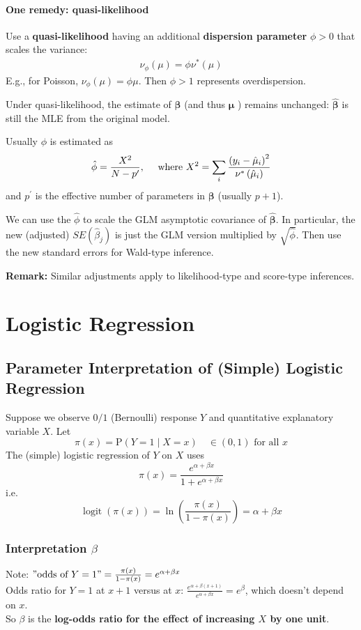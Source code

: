 \documentclass[11pt]{elegantbook}
\begin{document}
\subsubsection*{One remedy: quasi-likelihood}
Use a \textbf{quasi-likelihood} having an additional \textbf{dispersion parameter} $\phi>0$ that scales the variance:
\begin{equation}
    \begin{aligned}
        \nu_\phi(\mu)=\phi\nu^*(\mu)
    \end{aligned}
    \nonumber
\end{equation}
E.g., for Poisson, $\nu_\phi(\mu)=\phi\mu$. Then $\phi > 1$ represents overdispersion.

Under quasi-likelihood, the estimate of $\boldsymbol{\beta}$ (and thus $\boldsymbol{\mu}$ ) remains unchanged: $\hat{\boldsymbol{\beta}}$ is still the MLE from the original model.

Usually $\phi$ is estimated as
$$
\hat{\phi}=\frac{X^2}{N-p^{\prime}},\quad\textnormal{ where }
X^2=\sum_i \frac{\left(y_i-\hat{\mu}_i\right)^2}{\nu^*\left(\hat{\mu}_i\right)}
$$
and $p^{\prime}$ is the effective number of parameters in $\boldsymbol{\beta}$ (usually $p+1$).

We can use the $\hat{\phi}$ to scale the GLM asymptotic covariance of $\hat{\boldsymbol{\beta}}$. In particular, the new (adjusted) $S E\left(\hat{\beta}_j\right)$ is just the GLM version multiplied by $\sqrt{\hat{\phi}}$. Then use the new standard errors for Wald-type inference.

\textbf{Remark:} Similar adjustments apply to likelihood-type and score-type inferences.

\chapter{Logistic Regression}
\section{Parameter Interpretation of (Simple) Logistic Regression}
Suppose we observe $0 / 1$ (Bernoulli) response $Y$ and quantitative explanatory variable $X$.
Let
$$
\pi(x)=\mathrm{P}(Y=1 \mid X=x) \quad \in(0,1) \text { for all } x
$$
The (simple) logistic regression of $Y$ on $X$ uses
$$
\pi(x)=\frac{e^{\alpha+\beta x}}{1+e^{\alpha+\beta x}}
$$
i.e.
$$
\operatorname{logit}(\pi(x))=\ln \left(\frac{\pi(x)}{1-\pi(x)}\right)=\alpha+\beta x
$$
\subsection{Interpretation $\beta$}
Note: $"\text {odds of } Y=1"=\frac{\pi(x)}{1-\pi(x)}=e^{\alpha+\beta x}$\\
Odds ratio for $Y=1$ at $x+1$ versus at $x$: $\frac{e^{\alpha+\beta(x+1)}}{e^{\alpha+\beta x}}=e^\beta$, which doesn't depend on $x$.\\
So $\beta$ is the \textbf{log-odds ratio for the effect of increasing $X$ by one unit}.
\end{document}
